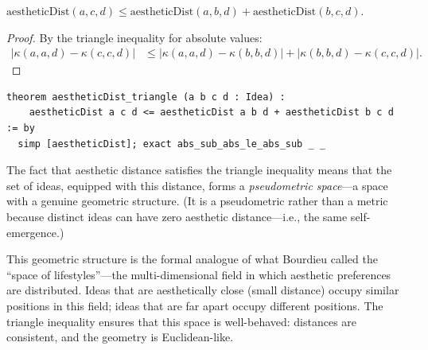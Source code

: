 \begin{theorem}
\label{thm:aest-dist-triangle}
$\mathrm{aestheticDist}(a, c, d) \leq
 \mathrm{aestheticDist}(a, b, d) + \mathrm{aestheticDist}(b, c, d)$.
\end{theorem}

\begin{proof}
By the triangle inequality for absolute values:
\begin{align*}
  |\kappa(a, a, d) - \kappa(c, c, d)|
    &\leq |\kappa(a, a, d) - \kappa(b, b, d)|
        + |\kappa(b, b, d) - \kappa(c, c, d)|.
\end{align*}
\end{proof}

\begin{lstlisting}
theorem aestheticDist_triangle (a b c d : Idea) :
    aestheticDist a c d <= aestheticDist a b d + aestheticDist b c d := by
  simp [aestheticDist]; exact abs_sub_abs_le_abs_sub _ _
\end{lstlisting}

\begin{interpretation}
\label{int:aesthetic-geometry}
The fact that aesthetic distance satisfies the triangle inequality means
that the set of ideas, equipped with this distance, forms a
\emph{pseudometric space}---a space with a genuine geometric structure.
(It is a pseudometric rather than a metric because distinct ideas can
have zero aesthetic distance---i.e., the same self-emergence.)

This geometric structure is the formal analogue of what Bourdieu called
the ``space of lifestyles''---the multi-dimensional field in which
aesthetic preferences are distributed.  Ideas that are aesthetically
close (small distance) occupy similar positions in this field; ideas
that are far apart occupy different positions.  The triangle inequality
ensures that this space is well-behaved: distances are consistent, and
the geometry is Euclidean-like.
\end{interpretation}

